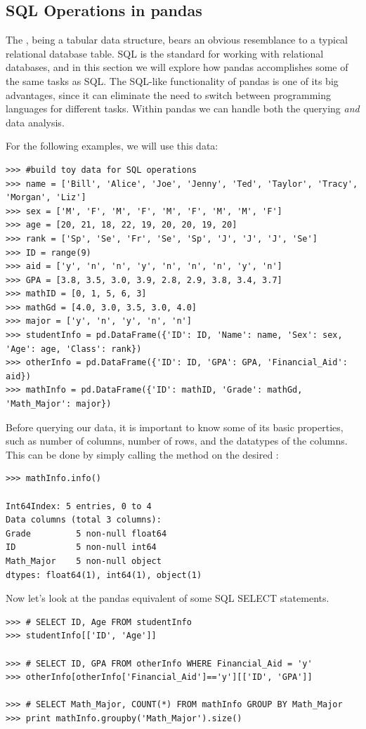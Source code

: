\subsection*{SQL Operations in pandas}
The , being a tabular data structure, bears an obvious resemblance to a typical relational
database table. SQL is the standard for working with relational databases, and in this section we will
explore how pandas accomplishes some of the same tasks as SQL. The SQL-like functionality of pandas is
one of its big advantages, since it can eliminate the need to switch between programming languages
for different tasks. Within pandas we can handle both the querying \emph{and} data analysis.

For the following examples, we will use this data:
\begin{lstlisting}
>>> #build toy data for SQL operations
>>> name = ['Bill', 'Alice', 'Joe', 'Jenny', 'Ted', 'Taylor', 'Tracy', 'Morgan', 'Liz']
>>> sex = ['M', 'F', 'M', 'F', 'M', 'F', 'M', 'M', 'F']
>>> age = [20, 21, 18, 22, 19, 20, 20, 19, 20]
>>> rank = ['Sp', 'Se', 'Fr', 'Se', 'Sp', 'J', 'J', 'J', 'Se']
>>> ID = range(9)
>>> aid = ['y', 'n', 'n', 'y', 'n', 'n', 'n', 'y', 'n']
>>> GPA = [3.8, 3.5, 3.0, 3.9, 2.8, 2.9, 3.8, 3.4, 3.7]
>>> mathID = [0, 1, 5, 6, 3]
>>> mathGd = [4.0, 3.0, 3.5, 3.0, 4.0]
>>> major = ['y', 'n', 'y', 'n', 'n']
>>> studentInfo = pd.DataFrame({'ID': ID, 'Name': name, 'Sex': sex, 'Age': age, 'Class': rank})
>>> otherInfo = pd.DataFrame({'ID': ID, 'GPA': GPA, 'Financial_Aid': aid})
>>> mathInfo = pd.DataFrame({'ID': mathID, 'Grade': mathGd, 'Math_Major': major})
\end{lstlisting}

Before querying our data, it is important to know some of its basic properties, such as
number of columns, number of rows, and the datatypes of the columns. This can be done
by simply calling the  method on the desired :
\begin{lstlisting}
>>> mathInfo.info()

Int64Index: 5 entries, 0 to 4
Data columns (total 3 columns):
Grade         5 non-null float64
ID            5 non-null int64
Math_Major    5 non-null object
dtypes: float64(1), int64(1), object(1)
\end{lstlisting}

Now let's look at the pandas equivalent of some SQL SELECT statements.
\begin{lstlisting}
>>> # SELECT ID, Age FROM studentInfo
>>> studentInfo[['ID', 'Age']]

>>> # SELECT ID, GPA FROM otherInfo WHERE Financial_Aid = 'y'
>>> otherInfo[otherInfo['Financial_Aid']=='y'][['ID', 'GPA']]

>>> # SELECT Math_Major, COUNT(*) FROM mathInfo GROUP BY Math_Major
>>> print mathInfo.groupby('Math_Major').size()
\end{lstlisting}

